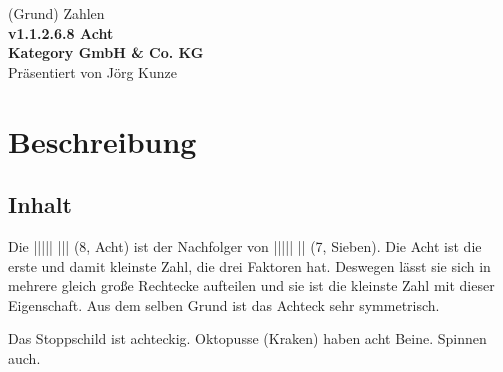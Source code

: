 \documentclass[a4paper]{amsart}
\theoremstyle{definition}
\begin{document}
\begin{titlepage}
\centering
{\huge
(Grund) Zahlen\\[1cm]
\textbf{v1.1.2.6.8 Acht}
}\\[1cm]

\textbf{Kategory GmbH \& Co. KG}\\
Präsentiert von Jörg Kunze

\end{titlepage}

%

\newpage

\section*{Beschreibung}

\subsection*{Inhalt}
Die ||||| ||| (8, Acht) ist der Nachfolger von ||||| || (7, Sieben). Die Acht ist die erste und damit kleinste Zahl, die drei Faktoren hat. Deswegen lässt sie sich in mehrere gleich große Rechtecke aufteilen und sie ist die kleinste Zahl mit dieser Eigenschaft. Aus dem selben Grund ist das Achteck sehr symmetrisch.

Das Stoppschild ist achteckig. Oktopusse (Kraken) haben acht Beine. Spinnen auch.
\end{document}
